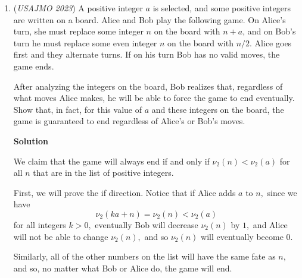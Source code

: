 \begin{enumerate}
 



\textbf{Solution}

It is clear that $B$ can guarantee a score of $4$ squares. We will show that $R$ has a strategy to limit blue to $4$ squares, thus solving the problem.

 Partition the grid into 2x2 squares. Red's strategy is as follows: 

 - If $B$ plays in a 2x2 square, play the two adjacent squares to $B$'s square that are not in the 2x2 square.- If one (or both) of these moves are blocked, instead play a square a megaparsec away from the rest of the moves. This move can only benefit you and will not change the outcome of the game.

 By induction, it is clear that no two blue squares that are adjacent are not in the same 2x2 square. Thus, we conclude that $R$ has limited blue to a maximum score of $2^2 = 4$, and the proof is complete. $\square$



	\item (\textit{USAJMO 2023}) A positive integer $a$ is selected, and some positive integers are written on a board. Alice and Bob play the following game. On Alice's turn, she must replace some integer $n$ on the board with $n+a$, and on Bob's turn he must replace some even integer $n$ on the board with $n/2$. Alice goes first and they alternate turns. If on his turn Bob has no valid moves, the game ends.


 After analyzing the integers on the board, Bob realizes that, regardless of what moves Alice makes, he will be able to force the game to end eventually. Show that, in fact, for this value of $a$ and these integers on the board, the game is guaranteed to end regardless of Alice's or Bob's moves.


 



\textbf{Solution}

We claim that the game will always end if and only if $\nu_{2}(n) < \nu_{2} (a)$ for all $n$ that are in the list of positive integers.

 
First, we will prove the if direction. Notice that if Alice adds $a$ to $n,$ since we have 
 \[\nu_{2} (ka+n) = \nu_{2} (n) < \nu_{2} (a)\] for all integers $k>0,$ eventually Bob will decrease $\nu_{2} (n)$ by $1,$ and Alice will not be able to change $\nu_{2} (n),$ and so $\nu_{2}(n)$ will eventually become $0.$ 

 Similarly, all of the other numbers on the list will have the same fate as $n,$ and so, no matter what Bob or Alice do, the game will end.


\end{enumerate}
